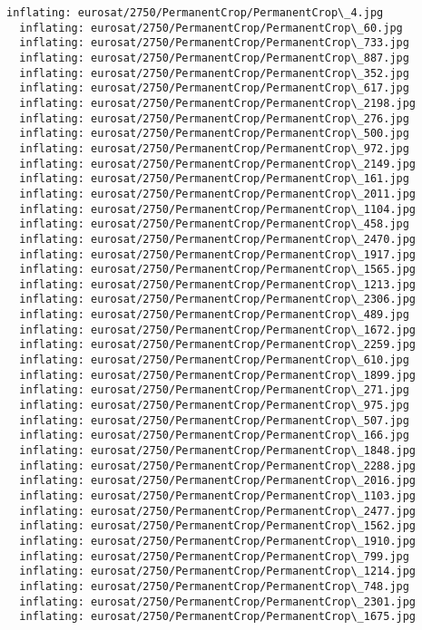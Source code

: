 \documentclass[11pt]{article}
\begin{document}
\begin{Verbatim}[commandchars=\\\{\}]
  inflating: eurosat/2750/PermanentCrop/PermanentCrop\_4.jpg
  inflating: eurosat/2750/PermanentCrop/PermanentCrop\_60.jpg
  inflating: eurosat/2750/PermanentCrop/PermanentCrop\_733.jpg
  inflating: eurosat/2750/PermanentCrop/PermanentCrop\_887.jpg
  inflating: eurosat/2750/PermanentCrop/PermanentCrop\_352.jpg
  inflating: eurosat/2750/PermanentCrop/PermanentCrop\_617.jpg
  inflating: eurosat/2750/PermanentCrop/PermanentCrop\_2198.jpg
  inflating: eurosat/2750/PermanentCrop/PermanentCrop\_276.jpg
  inflating: eurosat/2750/PermanentCrop/PermanentCrop\_500.jpg
  inflating: eurosat/2750/PermanentCrop/PermanentCrop\_972.jpg
  inflating: eurosat/2750/PermanentCrop/PermanentCrop\_2149.jpg
  inflating: eurosat/2750/PermanentCrop/PermanentCrop\_161.jpg
  inflating: eurosat/2750/PermanentCrop/PermanentCrop\_2011.jpg
  inflating: eurosat/2750/PermanentCrop/PermanentCrop\_1104.jpg
  inflating: eurosat/2750/PermanentCrop/PermanentCrop\_458.jpg
  inflating: eurosat/2750/PermanentCrop/PermanentCrop\_2470.jpg
  inflating: eurosat/2750/PermanentCrop/PermanentCrop\_1917.jpg
  inflating: eurosat/2750/PermanentCrop/PermanentCrop\_1565.jpg
  inflating: eurosat/2750/PermanentCrop/PermanentCrop\_1213.jpg
  inflating: eurosat/2750/PermanentCrop/PermanentCrop\_2306.jpg
  inflating: eurosat/2750/PermanentCrop/PermanentCrop\_489.jpg
  inflating: eurosat/2750/PermanentCrop/PermanentCrop\_1672.jpg
  inflating: eurosat/2750/PermanentCrop/PermanentCrop\_2259.jpg
  inflating: eurosat/2750/PermanentCrop/PermanentCrop\_610.jpg
  inflating: eurosat/2750/PermanentCrop/PermanentCrop\_1899.jpg
  inflating: eurosat/2750/PermanentCrop/PermanentCrop\_271.jpg
  inflating: eurosat/2750/PermanentCrop/PermanentCrop\_975.jpg
  inflating: eurosat/2750/PermanentCrop/PermanentCrop\_507.jpg
  inflating: eurosat/2750/PermanentCrop/PermanentCrop\_166.jpg
  inflating: eurosat/2750/PermanentCrop/PermanentCrop\_1848.jpg
  inflating: eurosat/2750/PermanentCrop/PermanentCrop\_2288.jpg
  inflating: eurosat/2750/PermanentCrop/PermanentCrop\_2016.jpg
  inflating: eurosat/2750/PermanentCrop/PermanentCrop\_1103.jpg
  inflating: eurosat/2750/PermanentCrop/PermanentCrop\_2477.jpg
  inflating: eurosat/2750/PermanentCrop/PermanentCrop\_1562.jpg
  inflating: eurosat/2750/PermanentCrop/PermanentCrop\_1910.jpg
  inflating: eurosat/2750/PermanentCrop/PermanentCrop\_799.jpg
  inflating: eurosat/2750/PermanentCrop/PermanentCrop\_1214.jpg
  inflating: eurosat/2750/PermanentCrop/PermanentCrop\_748.jpg
  inflating: eurosat/2750/PermanentCrop/PermanentCrop\_2301.jpg
  inflating: eurosat/2750/PermanentCrop/PermanentCrop\_1675.jpg

\end{Verbatim}
\end{document}
